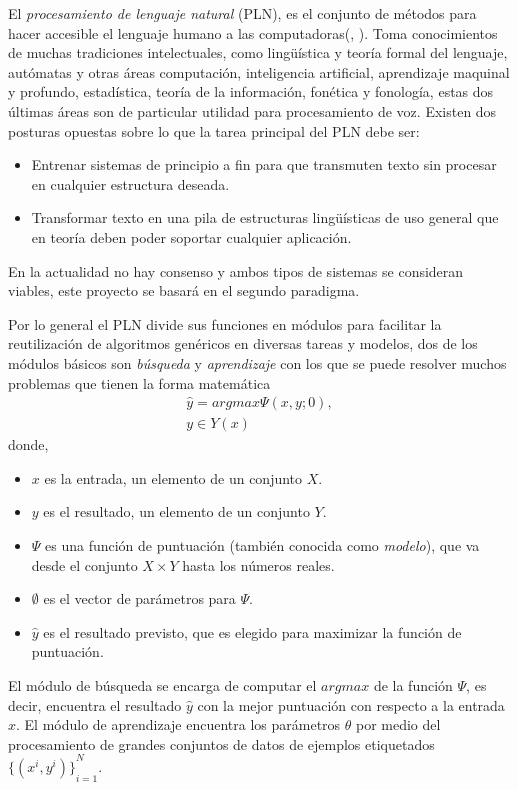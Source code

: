 El \emph{procesamiento de lenguaje natural} (PLN), es el conjunto de métodos para hacer accesible el lenguaje humano a las computadoras(\citeauthor{eise19}, \citeyear{eise19}). Toma conocimientos de muchas tradiciones intelectuales, como lingüística y teoría formal del lenguaje, autómatas y otras áreas computación, inteligencia artificial, aprendizaje maquinal y profundo, estadística, teoría de la información, fonética y fonología, estas dos últimas áreas son de particular utilidad para procesamiento de voz. Existen dos posturas opuestas sobre lo que la tarea principal del PLN debe ser:
\begin{itemize}
	\item Entrenar sistemas de principio a fin para que transmuten texto sin procesar en cualquier estructura deseada.
	\item Transformar texto en una pila de estructuras lingüísticas de uso general que en teoría deben poder soportar cualquier aplicación.
\end{itemize}
En la actualidad no hay consenso y ambos tipos de sistemas se consideran viables, este proyecto se basará en el segundo paradigma. 

Por lo general el PLN divide sus funciones en módulos para facilitar la reutilización de algoritmos genéricos en diversas tareas y modelos, dos de los módulos básicos son \emph{búsqueda} y \emph{aprendizaje} con los que se puede resolver muchos problemas que tienen la forma matemática
\begin{equation}
\begin{matrix}
\hat{y}=argmax\Psi(x,y;0),\\
y\in Y(x)
\end{matrix}\label{EQ:NLP1}
\end{equation}
donde,
\begin{itemize}
	\item $x$ es la entrada, un elemento de un conjunto $X$.
	\item $y$ es el resultado, un elemento de un conjunto $Y$.
	\item $\Psi$ es una función de puntuación (también conocida como \emph{modelo}), que va desde el conjunto $X\times Y$ hasta los números reales.
	\item $\emptyset$ es el vector de parámetros para $\Psi$.
	\item $\hat{y}$ es el resultado previsto, que es elegido para maximizar la función de puntuación.
\end{itemize}
El módulo de búsqueda se encarga de computar el $argmax$ de la función $\Psi$, es decir, encuentra el resultado $\hat{y}$ con la mejor puntuación con respecto a la entrada $x$. El módulo de aprendizaje encuentra los parámetros $\theta$ por medio del procesamiento de grandes conjuntos de datos de ejemplos etiquetados ${\{(x^i,y^i)\}}_{i=1}^{N}$.

